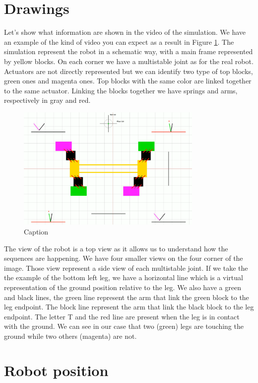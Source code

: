     \section{Drawings}
        Let's show what information are shown in the video of the simulation. We have an example of the kind of video you can expect as a result in Figure \ref{fig:drawing}. The simulation represent the robot in a schematic way, with a main frame represented by yellow blocks. On each corner we have a multistable joint as for the real robot. Actuators are not directly represented but we can identify two type of top blocks, green ones and magenta ones. Top blocks with the same color are linked together to the same actuator. Linking the blocks together we have springs and arms, respectively in gray and red. 
        
        \begin{figure}[h]
            \centering
            \includegraphics[width=0.8\textwidth]{images/drawing.png}
            \caption{Caption}
            \label{fig:drawing}
        \end{figure}
        
        The view of the robot is a top view as it allows us to understand how the sequences are happening. We have four smaller views on the four corner of the image. Those view represent a side view of each multistable joint. If we take the the example of the bottom left leg, we have a horizontal line which is a virtual representation of the ground position relative to the leg. We also have a green and black lines, the green line represent the arm that link the green block to the leg endpoint. The block line represent the arm that link the black block to the leg endpoint. The letter T and the red line are present when the leg is in contact with the ground. We can see in our case that two (green) legs are touching the ground while two others (magenta) are not.
        
    \section{Robot position}
        
        